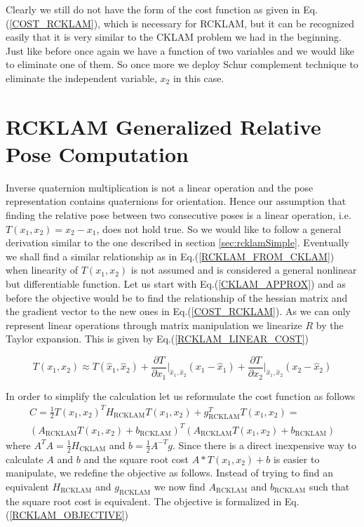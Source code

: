 Clearly we still do not have the form of the cost function as given in Eq.(\ref{COST_RCKLAM}), which is necessary for RCKLAM, but it can be recognized easily that it is very similar to the CKLAM problem we had in the beginning. Just like before once again we have a function of two variables and we would like to eliminate one of them. So once more we deploy Schur complement technique to eliminate the independent variable, $x_2$ in this case.

\section{RCKLAM Generalized Relative Pose Computation}
\label{RCKLAMGeneralizedFormulation}
Inverse quaternion multiplication is not a linear operation and the pose representation contains quaternions for orientation. Hence our assumption that finding the relative pose between two consecutive poses is a linear operation, i.e. $T(x_1, x_2) = x_2 - x_1$, does not hold true. So we would like to follow a general derivation similar to the one described in section \ref{sec:rcklamSimple}. Eventually we shall find a similar relationship as in Eq.(\ref{RCKLAM_FROM_CKLAM}) when linearity of $T(x_1, x_2)$ is not assumed and is considered a general nonlinear but differentiable function. Let us start with Eq.(\ref{CKLAM_APPROX}) and as before the objective would be to find the relationship of the hessian matrix and the gradient vector to the new ones in Eq.(\ref{COST_RCKLAM}). As we can only represent linear operations through matrix manipulation we linearize $R$ by the Taylor expansion. This is given by Eq.(\ref{RCKLAM_LINEAR_COST})

\begin{equation}
  T(x_1, x_2) \approx T(\hat x_1, \hat x_2) + \frac{\partial T} {\partial x_1}\biggr\rvert_{\hat x_1, \hat x_2} (x_1 - \hat x_1)+ \frac{\partial T} {\partial x_2}\biggr\rvert_{\hat x_1, \hat x_2} (x_2 - \hat x_2)
	\label{RCKLAM_LINEAR_COST}
\end{equation}

In order to simplify the calculation let us reformulate the cost function as follows
\begin{equation}
  \begin{split}
    C = \frac{1}{2}T(x_1, x_2)^TH_\mathrm{RCKLAM}T(x_1, x_2) + g_\mathrm{RCKLAM}^TT(x_1, x_2) = \\ (A_\mathrm{RCKLAM}T(x_1, x_2) + b_\mathrm{RCKLAM})^T(A_\mathrm{RCKLAM}T(x_1, x_2) + b_\mathrm{RCKLAM})
    \label{COST_RCKLAM_FACTORIZED}
    \end{split}
\end{equation}
 where $A^TA = \frac{1}{2}H_\mathrm{CKLAM}$ and $b = \frac{1}{2} A^{-T}g$. Since there is a direct inexpensive way to calculate $A$ and $b$ and the square root cost $A*T(x_1, x_2) + b$ is easier to manipulate, we redefine the objective as follows. Instead of trying to find an equivalent $H_\mathrm{RCKLAM}$ and $g_\mathrm{RCKLAM}$ we now find $A_\mathrm{RCKLAM}$ and $b_\mathrm{RCKLAM}$ such that the square root cost is equivalent. The objective is formalized in Eq.(\ref{RCKLAM_OBJECTIVE})

